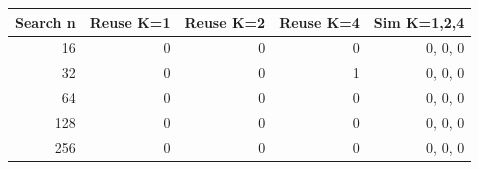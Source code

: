 \begin{tabular}{rrrrr}
\toprule
Search n & Reuse K=1 & Reuse K=2 & Reuse K=4 & Sim K=1,2,4 \\
\midrule
16 & 0 & 0 & 0 & 0, 0, 0 \\
32 & 0 & 0 & 1 & 0, 0, 0 \\
64 & 0 & 0 & 0 & 0, 0, 0 \\
128 & 0 & 0 & 0 & 0, 0, 0 \\
256 & 0 & 0 & 0 & 0, 0, 0 \\
\bottomrule
\end{tabular}
